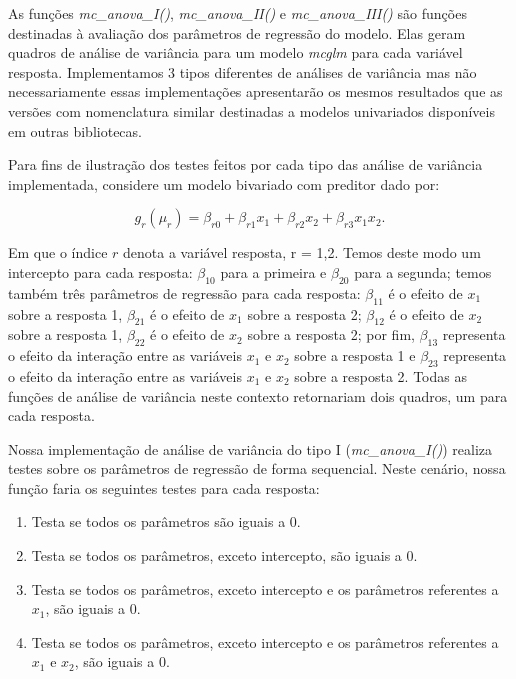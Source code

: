 As funções \emph{mc\_anova\_I()}, \emph{mc\_anova\_II()} e \emph{mc\_anova\_III()} são funções destinadas à avaliação dos parâmetros de regressão do modelo. Elas geram quadros de análise de variância para um modelo \emph{mcglm} para cada variável resposta. Implementamos 3 tipos diferentes de análises de variância mas não necessariamente essas implementações apresentarão os mesmos resultados que as versões com nomenclatura similar destinadas a modelos univariados disponíveis em outras bibliotecas.

Para fins de ilustração dos testes feitos por cada tipo das análise de variância implementada, considere um modelo bivariado com preditor dado por:

\begin{equation}
g_r(\mu_r) = \beta_{r0} + \beta_{r1} x_1 + \beta_{r2} x_2 + \beta_{r3} x_1x_2.
\end{equation}

\noindent Em que o índice $r$ denota a variável resposta, r = 1,2. Temos deste modo um intercepto para cada resposta: $\beta_{10}$ para a primeira e $\beta_{20}$ para a segunda; temos também três parâmetros de regressão para cada resposta: $\beta_{11}$ é o efeito de $x_1$ sobre a resposta 1, $\beta_{21}$ é o efeito de $x_1$ sobre a resposta 2; $\beta_{12}$ é o efeito de $x_2$ sobre a resposta 1, $\beta_{22}$ é o efeito de $x_2$ sobre a resposta 2; por fim, $\beta_{13}$ representa o efeito da interação entre as variáveis $x_1$ e $x_2$ sobre a resposta 1 e $\beta_{23}$ representa o efeito da interação entre as variáveis $x_1$ e $x_2$ sobre a resposta 2. Todas as funções de análise de variância neste contexto retornariam dois quadros, um para cada resposta.

Nossa implementação de análise de variância do tipo I (\emph{mc\_anova\_I()}) realiza testes sobre os parâmetros de regressão de forma sequencial. Neste cenário, nossa função faria os seguintes testes para cada resposta:

\begin{enumerate}
  \item Testa se todos os parâmetros são iguais a 0.
  \item Testa se todos os parâmetros, exceto intercepto, são iguais a 0.
  \item Testa se todos os parâmetros, exceto intercepto e os parâmetros referentes a $x_1$, são iguais a 0.
  \item Testa se todos os parâmetros, exceto intercepto e os parâmetros referentes a $x_1$ e $x_2$, são iguais a 0.
\end{enumerate}

